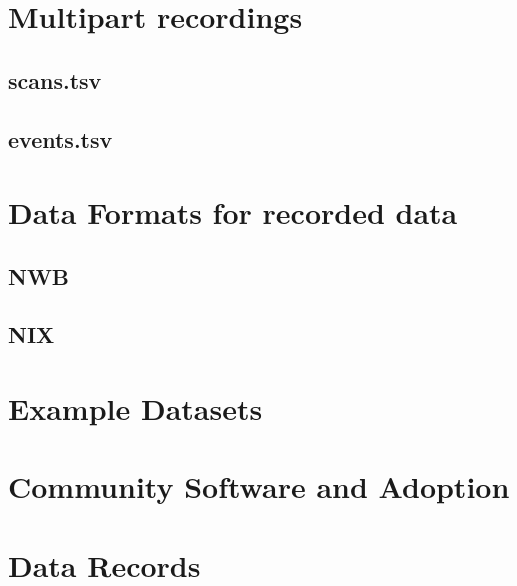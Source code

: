 \documentclass[fleqn,10pt]{wlscirep}
\begin{document}
\section*{Multipart recordings}
\subsection*{scans.tsv}
\subsection*{events.tsv}
\section*{Data Formats for recorded data}
\subsection*{NWB}
\subsection*{NIX}
\section*{Example Datasets}
\section*{Community Software and Adoption}
 

\section*{Data Records}

\end{document}

